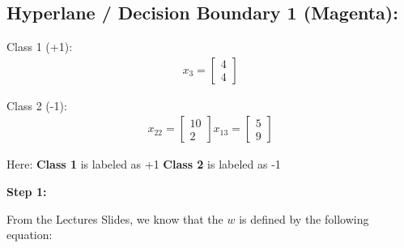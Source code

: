\documentclass[12pt]{report}
\begin{document}
\pagebreak

\subsection{Hyperlane / Decision Boundary 1 (Magenta):}

Class 1 (+1):
\begin{equation*}
	\begin{aligned}
		x_{3} = \begin{bmatrix}
			        4 \\
			        4
		        \end{bmatrix}
	\end{aligned}
\end{equation*}

Class 2 (-1):
\begin{equation*}
	\begin{aligned}
		x_{22} = \begin{bmatrix}
			         10 \\
			         2
		         \end{bmatrix}
		x_{13} = \begin{bmatrix}
			         5 \\
			         9
		         \end{bmatrix}
	\end{aligned}
\end{equation*}

Here:\newline
\textbf{Class 1} is labeled as +1 \newline
\textbf{Class 2} is labeled as -1

\textbf{Step 1:}

From the Lectures Slides, we know that the $w$ is defined by the following equation:
\end{document}
